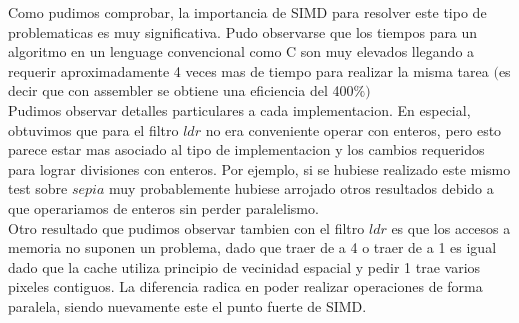 Como pudimos comprobar, la importancia de SIMD para resolver este tipo de problematicas es muy significativa. 
Pudo observarse que los tiempos para un algoritmo en un lenguage convencional como C son muy elevados llegando a requerir aproximadamente 4 veces mas de tiempo para realizar la misma tarea $($es decir que con assembler se obtiene una eficiencia del 400$ \% )$\\

Pudimos observar detalles particulares a cada implementacion. En especial, obtuvimos que para el filtro $ldr$ no era conveniente operar con enteros, pero esto parece estar mas asociado al tipo de implementacion y los cambios requeridos para lograr divisiones con enteros. Por ejemplo, si se hubiese realizado este mismo test sobre $sepia$ muy probablemente hubiese arrojado otros resultados debido a que operariamos de enteros sin perder paralelismo.\\

Otro resultado que pudimos observar tambien con el filtro $ldr$ es que los accesos a memoria no suponen un problema, dado que traer de a 4 o traer de a 1 es igual dado que la cache utiliza principio de vecinidad espacial y pedir 1 trae varios pixeles contiguos. La diferencia radica en poder realizar operaciones de forma paralela, siendo nuevamente este el punto fuerte de SIMD. \\


